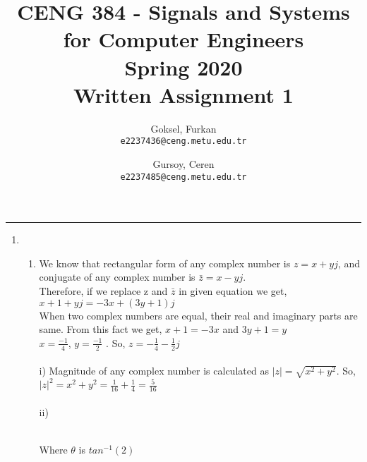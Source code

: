 \documentclass[10pt,a4paper, margin=1in]{article}
\author{
  Goksel, Furkan\\
  \texttt{e2237436@ceng.metu.edu.tr}
  \and
  Gursoy, Ceren\\
  \texttt{e2237485@ceng.metu.edu.tr}
}
\title{CENG 384 - Signals and Systems for Computer Engineers \\
Spring 2020 \\
Written Assignment 1}
\begin{document}
\maketitle



\noindent\rule{19cm}{1.2pt}

\begin{enumerate}

\item
    \begin{enumerate}
    \item
    We know that rectangular form of any complex number is $z=x+yj$, and conjugate of any complex number is  $\bar{z}=x-yj$. \\
    Therefore, if we replace z and $\bar{z}$ in given equation we get, $x+1+yj = -3x+(3y+1)j$ \\
    When two complex numbers are equal, their real and imaginary parts are same. From this fact we get, $x+1=-3x$ and $3y+1=y$\\
    $x=\frac{-1}{4}$, $y=\frac{-1}{2}$ . So, $z=-\frac{1}{4}-\frac{1}{2}j$\\\\
    i) Magnitude of any complex number is calculated as $|z| = \sqrt{x^2+y^2}$. So, $|z|^2 = x^2+y^2= \frac{1}{16}+\frac{1}{4}=\frac{5}{16}$\\\\
    ii)\\  \\
        Where $\theta$ is $tan^{-1}(2)$ \\ \\

\end{enumerate}
\end{enumerate}
\end{document}
